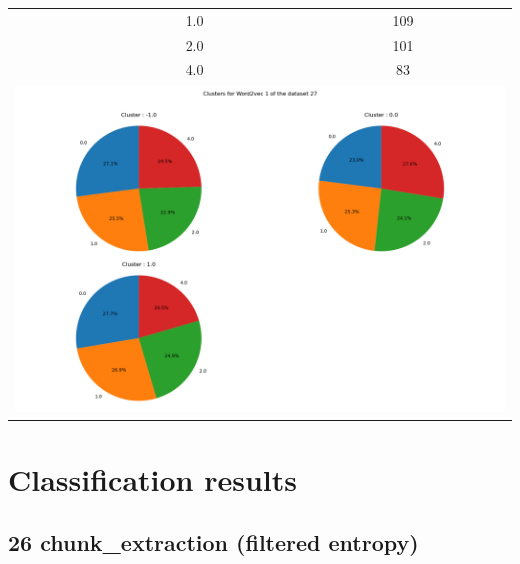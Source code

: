 \begin{longtable}{|c|c|c|c|c|}
& \multicolumn{2}{c|}{1.0} & \multicolumn{2}{c|}{109} \\
& \multicolumn{2}{c|}{2.0} & \multicolumn{2}{c|}{101} \\
& \multicolumn{2}{c|}{4.0} & \multicolumn{2}{c|}{83} \\
\hline
\multicolumn{5}{|c|}{\includegraphics[width=0.8\linewidth]{img/annexes/27/clustering_pie_charts/Word2vec 1.png}} \\
\end{longtable}


\section{Classification results}

\label{sec:annexe:classification_results}

\subsection{26 chunk\_extraction (filtered entropy)}

